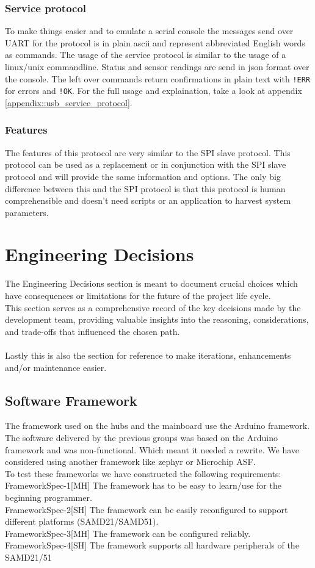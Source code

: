 \subsubsection{Service protocol}
To make things easier and to emulate a serial console the messages send over UART for the protocol is in plain ascii and represent abbreviated English words as commands. The usage of the service protocol is similar to the usage of a linux/unix commandline. Status and sensor readings are send in json format over the console. The left over commands return confirmations in plain text with \texttt{!ERR} for errors and \texttt{!OK}. For the full usage and explaination, take a look at appendix \ref{appendix::usb_service_protocol}.

\subsubsection{Features}
The features of this protocol are very similar to the SPI slave protocol. This protocol can be used as a replacement or in conjunction with the SPI slave protocol and will provide the same information and options. The only big difference between this and the SPI protocol is that this protocol is human comprehensible and doesn't need scripts or an application to harvest system parameters. 


\section{Engineering Decisions}
The Engineering Decisions section is meant to document crucial choices which have consequences or limitations for the future of the project life cycle. \\ 
This section serves as a comprehensive record of the key decisions made by the development team, providing valuable insights into the reasoning, considerations, and trade-offs that influenced the chosen path.\\\\
Lastly this is also the section for reference to make iterations, enhancements and/or maintenance easier.
\subsection{Software Framework}
The framework used on the hubs and the mainboard use the Arduino framework. The software delivered by the previous groups was based on the Arduino framework and was non-functional. Which meant it needed a rewrite. We have considered using another framework like zephyr or Microchip ASF. \\To test these frameworks we have constructed the following requirements:\\
FrameworkSpec-1[MH] The framework has to be easy to learn/use for the beginning programmer. \\
FrameworkSpec-2[SH] The framework can be easily reconfigured to support different platforms (SAMD21/SAMD51).\\
FrameworkSpec-3[MH] The framework can be configured reliably.\\
FrameworkSpec-4[SH] The framework supports all hardware peripherals of the SAMD21/51\\
\pagebreak

